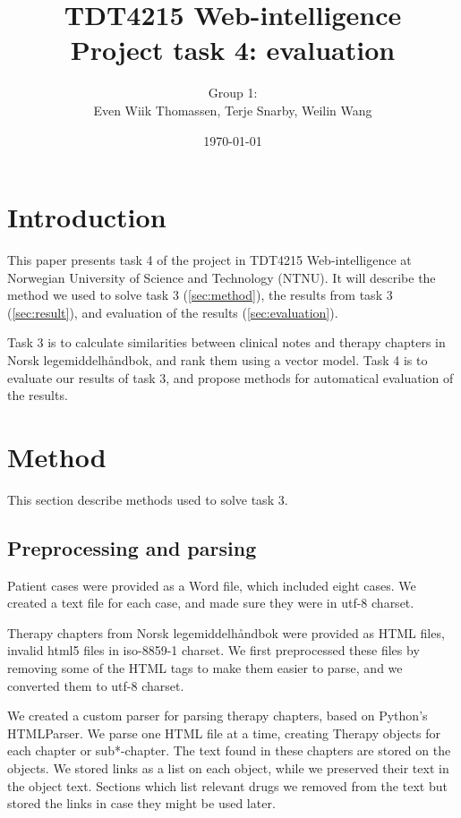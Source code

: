 \documentclass[a4paper, 11pt]{article}
\title{TDT4215 Web-intelligence\\Project task 4: evaluation}
\author{Group 1:\\Even Wiik Thomassen, Terje Snarby, Weilin Wang}
\date{\today}
\begin{document}

\maketitle
\tableofcontents


\section{Introduction}
This paper presents task 4 of the project in TDT4215 Web-intelligence at
Norwegian University of Science and Technology (NTNU). It will
describe the method we used to solve task 3 (\autoref{sec:method}),
the results from task 3 (\autoref{sec:result}),
and evaluation of the results (\autoref{sec:evaluation}).

Task 3 is to calculate similarities between clinical notes and therapy
chapters in Norsk legemiddelhåndbok, and rank them using a vector model.
Task 4 is to evaluate our results of task 3, and propose methods for
automatical evaluation of the results.


\section{Method}
\label{sec:method}
This section describe methods used to solve task 3.

\subsection{Preprocessing and parsing}
Patient cases were provided as a Word file, which included eight cases. We
created a text file for each case, and made sure they were in utf-8 charset.

Therapy chapters from Norsk legemiddelhåndbok were provided as HTML files,
invalid html5 files in iso-8859-1 charset. We first preprocessed these files
by removing some of the HTML tags to make them easier to parse, and we
converted them to utf-8 charset.

We created a custom parser for parsing therapy chapters, based on Python's
HTMLParser. We parse one HTML file at a time, creating Therapy objects for
each chapter or sub*-chapter. The text found in these chapters are stored
on the objects. We stored links as a list on each object, while we preserved
their text in the object text. Sections which list relevant drugs we removed
from the text but stored the links in case they might be used later.
\end{document}
